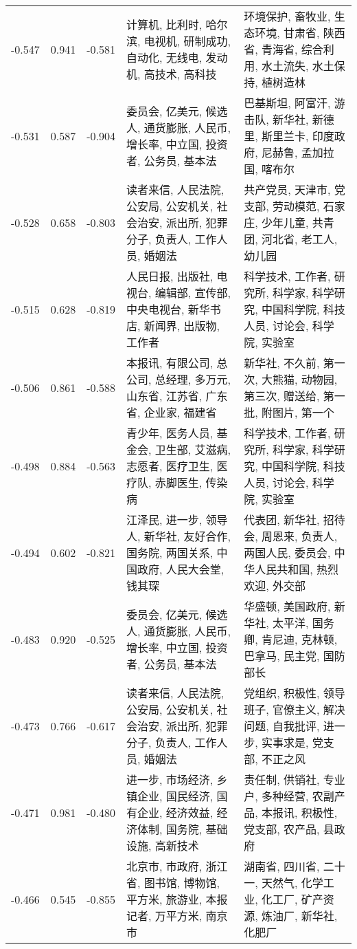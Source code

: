 \begin{tabular}{cccp{5cm}p{5cm}}
-0.547 & 0.941 & -0.581 & 计算机, 比利时, 哈尔滨, 电视机, 研制成功, 自动化, 无线电, 发动机, 高技术, 高科技 & 环境保护, 畜牧业, 生态环境, 甘肃省, 陕西省, 青海省, 综合利用, 水土流失, 水土保持, 植树造林 \\
-0.531 & 0.587 & -0.904 & 委员会, 亿美元, 候选人, 通货膨胀, 人民币, 增长率, 中立国, 投资者, 公务员, 基本法 & 巴基斯坦, 阿富汗, 游击队, 新华社, 新德里, 斯里兰卡, 印度政府, 尼赫鲁, 孟加拉国, 喀布尔 \\
-0.528 & 0.658 & -0.803 & 读者来信, 人民法院, 公安局, 公安机关, 社会治安, 派出所, 犯罪分子, 负责人, 工作人员, 婚姻法 & 共产党员, 天津市, 党支部, 劳动模范, 石家庄, 少年儿童, 共青团, 河北省, 老工人, 幼儿园 \\
-0.515 & 0.628 & -0.819 & 人民日报, 出版社, 电视台, 编辑部, 宣传部, 中央电视台, 新华书店, 新闻界, 出版物, 工作者 & 科学技术, 工作者, 研究所, 科学家, 科学研究, 中国科学院, 科技人员, 讨论会, 科学院, 实验室 \\
-0.506 & 0.861 & -0.588 & 本报讯, 有限公司, 总公司, 总经理, 多万元, 山东省, 江苏省, 广东省, 企业家, 福建省 & 新华社, 不久前, 第一次, 大熊猫, 动物园, 第三次, 赠送给, 第一批, 附图片, 第一个 \\
-0.498 & 0.884 & -0.563 & 青少年, 医务人员, 基金会, 卫生部, 艾滋病, 志愿者, 医疗卫生, 医疗队, 赤脚医生, 传染病 & 科学技术, 工作者, 研究所, 科学家, 科学研究, 中国科学院, 科技人员, 讨论会, 科学院, 实验室 \\
-0.494 & 0.602 & -0.821 & 江泽民, 进一步, 领导人, 新华社, 友好合作, 国务院, 两国关系, 中国政府, 人民大会堂, 钱其琛 & 代表团, 新华社, 招待会, 周恩来, 负责人, 两国人民, 委员会, 中华人民共和国, 热烈欢迎, 外交部 \\
-0.483 & 0.920 & -0.525 & 委员会, 亿美元, 候选人, 通货膨胀, 人民币, 增长率, 中立国, 投资者, 公务员, 基本法 & 华盛顿, 美国政府, 新华社, 太平洋, 国务卿, 肯尼迪, 克林顿, 巴拿马, 民主党, 国防部长 \\
-0.473 & 0.766 & -0.617 & 读者来信, 人民法院, 公安局, 公安机关, 社会治安, 派出所, 犯罪分子, 负责人, 工作人员, 婚姻法 & 党组织, 积极性, 领导班子, 官僚主义, 解决问题, 自我批评, 进一步, 实事求是, 党支部, 不正之风 \\
-0.471 & 0.981 & -0.480 & 进一步, 市场经济, 乡镇企业, 国民经济, 国有企业, 经济效益, 经济体制, 国务院, 基础设施, 高新技术 & 责任制, 供销社, 专业户, 多种经营, 农副产品, 本报讯, 积极性, 党支部, 农产品, 县政府 \\
-0.466 & 0.545 & -0.855 & 北京市, 市政府, 浙江省, 图书馆, 博物馆, 平方米, 旅游业, 本报记者, 万平方米, 南京市 & 湖南省, 四川省, 二十一, 天然气, 化学工业, 化工厂, 矿产资源, 炼油厂, 新华社, 化肥厂 \\

\end{tabular}
